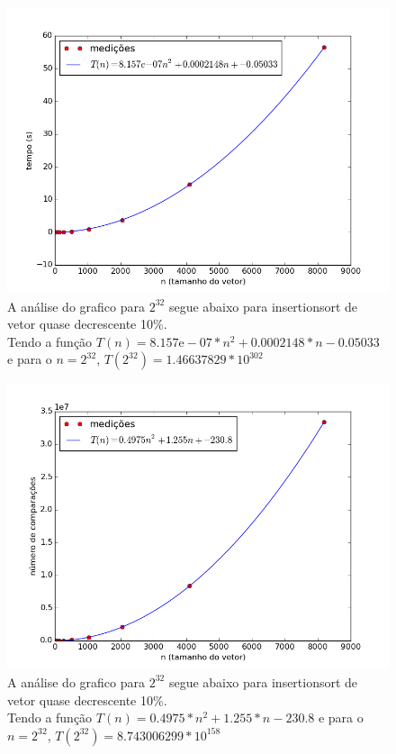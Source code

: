 \documentclass[12pt,a4paper,twoside]{report}
\begin{document}


\begin{figure}[ht]
\centering \includegraphics[scale=0.8]{../insertionsort/imagens/insertionsortQuaseDecresc100.png}
\caption{A análise do grafico para $2^{32}$ segue abaixo para insertionsort de vetor quase decrescente 10\%.\\
Tendo a função $T(n) = 8.157\mathrm{e}-07*n^2+0.0002148*n-0.05033$ e para o $n =2^{32}$, $T(2^{32}) = 1.46637829 * 10^{302}$}
\label{fig:insertionsortQuaseDecresc100}
\end{figure}

\begin{figure}[ht]
\centering \includegraphics[scale=0.8]{../insertionsort/imagens/insertionsortQuaseDecresc101.png}
\caption{A análise do grafico para $2^{32}$ segue abaixo para insertionsort de vetor quase decrescente 10\%.\\
Tendo a função $T(n) = 0.4975*n^2+1.255*n-230.8$ e para o $n =2^{32}$, $T(2^{32}) = 8.743006299 * 10^{158}$}
\label{fig:insertionsortQuaseDecresc101}
\end{figure}
\end{document}
